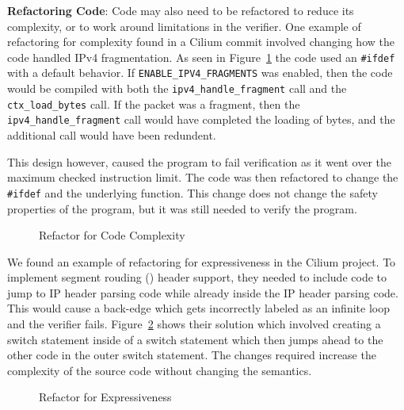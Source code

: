 \noindent\textbf{Refactoring Code}:
Code may also need to be refactored to reduce its complexity, or to work around limitations in the verifier.
One example of refactoring for complexity found in a Cilium commit involved changing how the code handled IPv4 fragmentation.
As seen in Figure~\ref{fig:refactor-fix} the code used an \texttt{\#ifdef} with a default behavior.
If \texttt{ENABLE\_IPV4\_FRAGMENTS} was enabled, then the code would be compiled with both the \texttt{ipv4\_handle\_fragment} call and the \texttt{ctx\_load\_bytes} call.
If the packet was a fragment, then the \texttt{ipv4\_handle\_fragment} call would have completed the loading of bytes, and the additional call would have been redundent.

This design however, caused the program to fail verification as it went over the maximum checked instruction limit.
The code was then refactored to change the \texttt{\#ifdef} and the underlying function.
This change does not change the safety properties of the program, but it was still needed to verify the program.

\begin{figure}
    
    \caption{Refactor for Code Complexity}
    \label{fig:refactor-fix}
\end{figure}


We found an example of refactoring for expressiveness in the Cilium project.
To implement segment rouding () header support, they needed to include code to jump to IP header parsing code while already inside the IP header parsing code.
This would cause a back-edge which gets incorrectly labeled as an infinite loop and the verifier fails.
Figure~\ref{fig:switch} shows their solution which involved creating a switch statement inside of a switch statement which then jumps ahead to the other code in the outer switch statement.
The changes required increase the complexity of the source code without changing the semantics.

\begin{figure}
    
    \caption{Refactor for Expressiveness}
    \label{fig:switch}
\end{figure}

